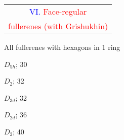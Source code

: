 \documentclass[%
pdf,
colorBG,
slideColor,
]{prosper}
\begin{document}
%





\begin{slide}{}
\begin{center}
{\Huge 
\begin{tabular*}{11cm}{c}
\\[-0.4cm]
\textcolor{blue}{VI. }\textcolor{red}{Face-regular}\\
\textcolor{red}{fullerenes (with Grishukhin)}
\end{tabular*}
}
\end{center}
\end{slide}


\begin{slide}{All fullerenes with hexagons in $1$ ring}

\begin{center}
\begin{minipage}[b]{3.5cm}
\centering
{}\par
$D_{5h}$; 30
\end{minipage}
\begin{minipage}[b]{3.5cm}
\centering
{}\par
$D_2$; 32
\end{minipage}
\begin{minipage}[b]{3.5cm}
\centering
{}\par
$D_{3d}$; 32
\end{minipage}
\begin{minipage}[b]{3.5cm}
\centering
{}\par
$D_{2d}$; 36
\end{minipage}
\begin{minipage}[b]{3.5cm}
\centering
{}\par
$D_2$; 40
\end{minipage}
\end{center}
\end{slide}
\end{document}
